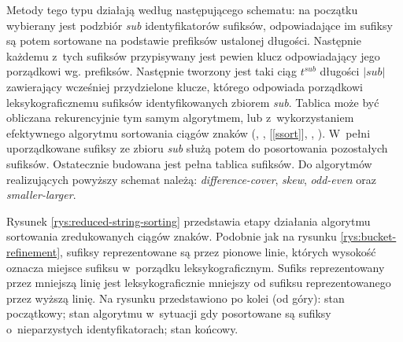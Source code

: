 Metody tego typu działają według następującego schematu: na początku wybierany jest podzbiór
\emph{sub} identyfikatorów sufiksów, odpowiadające im sufiksy są potem sortowane na podstawie
prefiksów ustalonej długości. Następnie każdemu z~tych sufiksów przypisywany jest pewien klucz
odpowiadający jego porządkowi wg. prefiksów. Następnie tworzony jest taki ciąg $t^{\textit{sub}}$
długości $|\textit{sub}|$ zawierający wcześniej przydzielone klucze, którego 
odpowiada porządkowi leksykograficznemu sufiksów identyfikowanych zbiorem \emph{sub}. Tablica
 może być obliczana rekurencyjnie tym samym algorytmem, lub z~wykorzystaniem
efektywnego algorytmu sortowania ciągów znaków (\cite{bentley-sort}, \cite{radix}, [\ref{ssort}],
\cite{bentley}, \cite{sinha}). W~pełni uporządkowane sufiksy ze zbioru \emph{sub} służą potem do
posortowania pozostałych sufiksów. Ostatecznie budowana jest pełna tablica sufiksów. Do algorytmów
realizujących powyższy schemat należą: \emph{difference-cover}, \emph{skew}, \emph{odd-even} oraz
\emph{smaller-larger}.

Rysunek \ref{rys:reduced-string-sorting} przedstawia etapy działania algorytmu
sortowania zredukowanych ciągów znaków. Podobnie jak na rysunku
\ref{rys:bucket-refinement}, sufiksy reprezentowane są przez pionowe linie,
których wysokość oznacza miejsce sufiksu w~porządku leksykograficznym. Sufiks
reprezentowany przez mniejszą linię jest leksykograficznie mniejszy od sufiksu
reprezentowanego przez wyższą linię. Na rysunku przedstawiono po kolei (od
góry): stan początkowy; stan algorytmu w~sytuacji gdy posortowane są sufiksy
o~nieparzystych identyfikatorach; stan końcowy.


